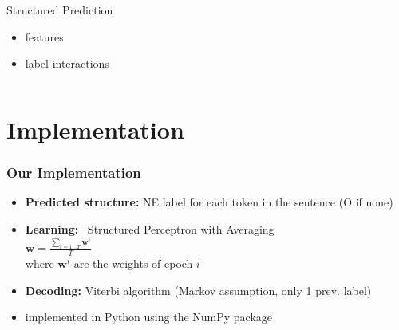 \documentclass[10pt]{beamer}
\begin{document}
\begin{frame}[t]
\begin{columns}[t]
\begin{column}{.3\textwidth}
	Structured Prediction
	
	\small
	\begin{itemize}
		\item features
		\item label interactions
	\end{itemize}
\end{column}


\end{columns}





\end{frame}



\section{Implementation}
\begin{frame}
\frametitle{Our Implementation}

\begin{itemize}
 \item \textbf{Predicted structure:} NE label for each token in the sentence (O if none)
 \item \textbf{Learning:} ~Structured Perceptron with Averaging\\\vspace{0.3cm}\hspace{0.6cm}
	$\displaystyle \mathbf{w} = \frac{\sum_{i = 1...T}{\mathbf{w}^{i}}}{T}$\\ \hspace{0.6cm}where $\mathbf{w}^{i}$ are the weights of epoch $i$
\vspace{0.2cm}


 \item \textbf{Decoding:} Viterbi algorithm (Markov assumption, only 1 prev. label)
 \item implemented in Python using the NumPy package
\end{itemize}
\end{frame}


\end{document}
